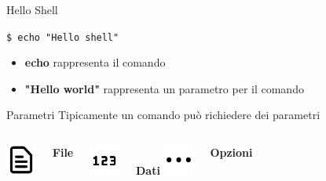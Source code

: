 \documentclass{beamer}
\begin{document}
    \begin{frame}{Hello Shell}
        \begin{exampleblock}{}
            \texttt{\$ echo "Hello shell"}
        \end{exampleblock}

        \begin{itemize}
            \item \textbf{echo} rappresenta il comando
            \item \textbf{"Hello world"} rappresenta un parametro per il comando
        \end{itemize}

        \begin{block}{Parametri}
            Tipicamente un comando può richiedere dei parametri
            
            \vspace{0.5cm}

            \begin{columns}[t, onlytextwidth]
                    \centering
                    \includegraphics[height=1cm, keepaspectratio]{images/file.pdf}
                    
                    \textbf{File}
    
                    \centering
                    \includegraphics[height=1cm, keepaspectratio]{images/input-data.pdf}
                    
                    \textbf{Dati}
                    \centering
                    \includegraphics[height=1cm, keepaspectratio]{images/options.pdf}
                    
                    \textbf{Opzioni}
            \end{columns}

            \vspace{0.5cm}
        \end{block}
    \end{frame}
\end{document}

